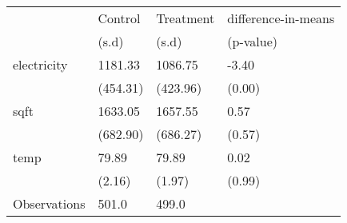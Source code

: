 \begin{tabular}{llll}
\toprule
{} &   Control & Treatment & difference-in-means \\
{} &     (s.d) &     (s.d) &           (p-value) \\
\midrule
electricity  &   1181.33 &   1086.75 &               -3.40 \\
             &  (454.31) &  (423.96) &              (0.00) \\
sqft         &   1633.05 &   1657.55 &                0.57 \\
             &  (682.90) &  (686.27) &              (0.57) \\
temp         &     79.89 &     79.89 &                0.02 \\
             &    (2.16) &    (1.97) &              (0.99) \\
Observations &     501.0 &     499.0 &                     \\
\bottomrule
\end{tabular}
